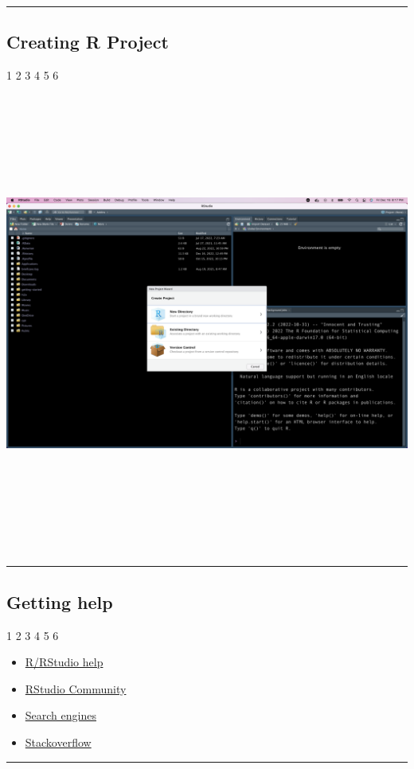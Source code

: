 \documentclass[
  letterpaper,
  DIV=11,
  numbers=noendperiod]{scrartcl}
\providecommand{\tightlist}{%
  \setlength{\itemsep}{0pt}\setlength{\parskip}{0pt}}\usepackage{longtable,booktabs,array}
\begin{document}
\begin{center}\rule{0.5\linewidth}{0.5pt}\end{center}

\hypertarget{creating-r-project}{%
\subsection{Creating R Project}\label{creating-r-project}}

1 {2 3 4 5 6}

\includegraphics[width=1\textwidth,height=5.97917in]{images/new-project.png}

\begin{center}\rule{0.5\linewidth}{0.5pt}\end{center}

\hypertarget{getting-help}{%
\subsection{Getting help}\label{getting-help}}

1 {2 3 4 5 6}

\begin{itemize}
\tightlist
\item
  \href{}{R/RStudio help}
\item
  \href{https://community.rstudio.com/latest}{RStudio Community}
\item
  \href{www.google.com}{Search engines}
\item
  \href{https://stackoverflow.com/}{Stackoverflow}
\end{itemize}

\begin{center}\rule{0.5\linewidth}{0.5pt}\end{center}
\end{document}

